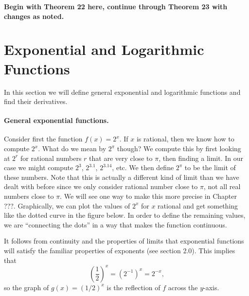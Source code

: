 \documentclass[12pt]{report}
\begin{document}
{\color{blue} \bfseries Begin with Theorem 22 here, continue through Theorem 23 with changes as noted.}

\section{Exponential and Logarithmic Functions}

In this section we will define general exponential and logarithmic functions and find their derivatives. 

\paragraph{General exponential functions.} Consider first the function $f(x)=2^x$. If $x$ is rational, then we know how to compute $2^x$. What do we mean by $2^\pi$ though? We compute this by first looking at $2^r$ for rational numbers $r$ that are very close to $\pi$, then finding a limit. In our case we might compute $2^3$, $2^{3.1}$, $2^{3.14}$, etc. We then define $2^\pi$ to be the limit of these numbers. Note that this is actually a different kind of limit than we have dealt with before since we only consider rational number close to $\pi$, not all real numbers close to $\pi$. We will see one way to make this more precise in Chapter ???. Graphically, we can plot the values of $2^x$ for $x$ rational and get something like the dotted curve in the figure below. In order to define the remaining values, we are ``connecting the dots'' in a way that makes the function continuous.

\begin{center}
\end{center}

It follows from continuity and the properties of limits that exponential functions will satisfy the familiar properties of exponents (see section 2.0).  This implies that \[\left(\frac12\right)^x =(2^{-1})^x=2^{-x}\text{,}\] so the graph of $g(x)=(1/2)^x$ is the reflection of $f$ across the $y$-axis.

\begin{center}
\end{center}
\end{document}

